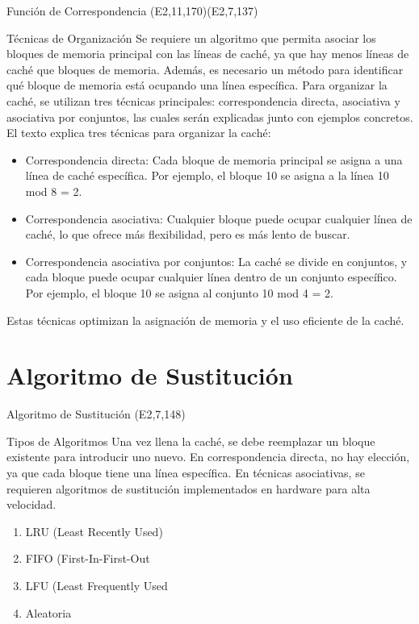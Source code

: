 \documentclass[presentation]{beamer}
\begin{document}
\begin{frame}[allowframebreaks]{Función de Correspondencia (E2,11,170)(E2,7,137)}
\begin{block}{Técnicas de Organización}
Se requiere un algoritmo que permita asociar los bloques de memoria principal con las líneas de caché, ya que hay menos líneas de caché que bloques de memoria. Además, es necesario un método para identificar qué bloque de memoria está ocupando una línea específica. Para organizar la caché, se utilizan tres técnicas principales: correspondencia directa, asociativa y asociativa por conjuntos, las cuales serán explicadas junto con ejemplos concretos.
El texto explica tres técnicas para organizar la caché:

\begin{itemize}
\item \alert{\alert{Correspondencia directa:}} Cada bloque de memoria principal se asigna a una línea de caché específica. Por ejemplo, el bloque 10 se asigna a la línea 10 mod 8 = 2.

\item \alert{\alert{Correspondencia asociativa:}} Cualquier bloque puede ocupar cualquier línea de caché, lo que ofrece más flexibilidad, pero es más lento de buscar.

\item \alert{\alert{Correspondencia asociativa por conjuntos:}} La caché se divide en conjuntos, y cada bloque puede ocupar cualquier línea dentro de un conjunto específico. Por ejemplo, el bloque 10 se asigna al conjunto 10 mod 4 = 2.
\end{itemize}

Estas técnicas optimizan la asignación de memoria y el uso eficiente de la caché.
\end{block}
\end{frame}

\section{Algoritmo de Sustitución}
\label{sec:org37bcd7a}
\begin{frame}[allowframebreaks]{Algoritmo de Sustitución (E2,7,148)}
\begin{block}{Tipos de Algoritmos}
Una vez llena la caché, se debe reemplazar un bloque existente para introducir uno nuevo.
En correspondencia directa, no hay elección, ya que cada bloque tiene una línea específica.
En técnicas asociativas, se requieren algoritmos de sustitución implementados en hardware para alta velocidad.\autocite{stallings2006organización}
\begin{enumerate}
\item LRU (Least Recently Used)
\item FIFO (First-In-First-Out
\item LFU (Least Frequently Used
\item Aleatoria
\end{enumerate}
\end{block}
\end{frame}
\end{document}
